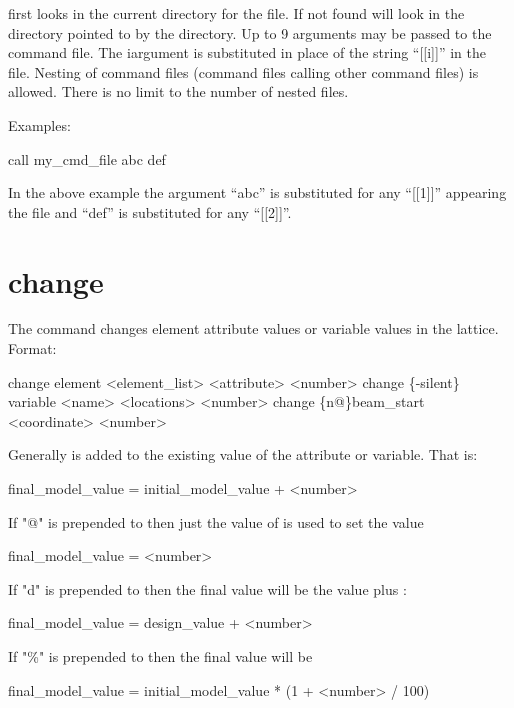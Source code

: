 \vskip 0.2in 
\tao first looks in the current directory for the file. If not
found \tao will look in the directory pointed to by the
 directory.  Up to 9 arguments may be passed to
the command file. The i\Th argument is substituted in place of the
string ``[[i]]'' in the file. Nesting of command files (command files
calling other command files) is allowed. There is no limit to the
number of nested files.

Examples:
\begin{example}
    call my_cmd_file abc def 
\end{example}
In the above example the argument ``abc'' is substituted for any
``[[1]]'' appearing the file and ``def'' is substituted for any
``[[2]]''.
\Newline

\section{change}
\label{s:change}

The  command changes element attribute values or variable
values in the  lattice. Format:
\begin{example}
  change element <element_list> <attribute> <number>
  change \{-silent\} variable <name> <locations> <number>
  change  \{n@\}beam_start <coordinate> <number>
\end{example}

\vskip 0.2in 
Generally  is added to the existing value of the
attribute or variable. That is:
\begin{example}
  final_model_value = initial_model_value + <number>
\end{example}
If "@" is prepended to  then just the value of
 is used to set the value
\begin{example}
  final_model_value = <number>
\end{example}
If "d" is prepended to  then the final value will be the
 value plus :
\begin{example}
  final_model_value = design_value + <number>
\end{example}
If "\%" is prepended to  then the final value will be
\begin{example}
  final_model_value = initial_model_value * (1 + <number> / 100)
\end{example}

